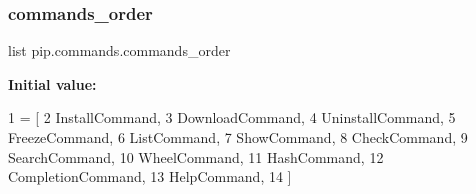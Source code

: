 \subsubsection{\texorpdfstring{commands\+\_\+order}{commands\_order}}
{\footnotesize\ttfamily list pip.\+commands.\+commands\+\_\+order}

{\bfseries Initial value\+:}
\begin{DoxyCode}
1 =  [
2     InstallCommand,
3     DownloadCommand,
4     UninstallCommand,
5     FreezeCommand,
6     ListCommand,
7     ShowCommand,
8     CheckCommand,
9     SearchCommand,
10     WheelCommand,
11     HashCommand,
12     CompletionCommand,
13     HelpCommand,
14 ]
\end{DoxyCode}
